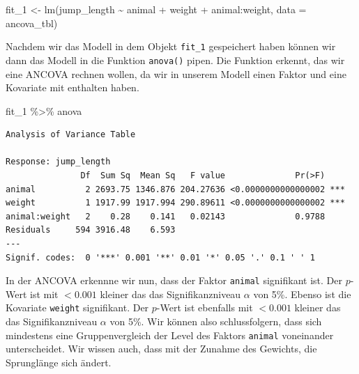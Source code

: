 \documentclass[
  letterpaper,
]{scrbook}
\newenvironment{Shaded}{\begin{snugshade}}{\end{snugshade}}
\newcommand{\AttributeTok}[1]{\textcolor[rgb]{0.40,0.45,0.13}{#1}}
\newcommand{\FunctionTok}[1]{\textcolor[rgb]{0.28,0.35,0.67}{#1}}
\newcommand{\NormalTok}[1]{\textcolor[rgb]{0.00,0.23,0.31}{#1}}
\newcommand{\OtherTok}[1]{\textcolor[rgb]{0.00,0.23,0.31}{#1}}
\newcommand{\SpecialCharTok}[1]{\textcolor[rgb]{0.37,0.37,0.37}{#1}}
\begin{document}
\begin{Shaded}
\begin{Highlighting}[]
\NormalTok{fit\_1 }\OtherTok{\textless{}{-}} \FunctionTok{lm}\NormalTok{(jump\_length }\SpecialCharTok{\textasciitilde{}}\NormalTok{ animal }\SpecialCharTok{+}\NormalTok{ weight }\SpecialCharTok{+}\NormalTok{ animal}\SpecialCharTok{:}\NormalTok{weight, }\AttributeTok{data =}\NormalTok{ ancova\_tbl)}
\end{Highlighting}
\end{Shaded}

Nachdem wir das Modell in dem Objekt \texttt{fit\_1} gespeichert haben
können wir dann das Modell in die Funktion \texttt{anova()} pipen. Die
Funktion erkennt, das wir eine ANCOVA rechnen wollen, da wir in unserem
Modell einen Faktor und eine Kovariate mit enthalten haben.

\begin{Shaded}
\begin{Highlighting}[]
\NormalTok{fit\_1 }\SpecialCharTok{\%\textgreater{}\%}\NormalTok{ anova }
\end{Highlighting}
\end{Shaded}

\begin{verbatim}
Analysis of Variance Table

Response: jump_length
               Df  Sum Sq  Mean Sq   F value              Pr(>F)    
animal          2 2693.75 1346.876 204.27636 <0.0000000000000002 ***
weight          1 1917.99 1917.994 290.89611 <0.0000000000000002 ***
animal:weight   2    0.28    0.141   0.02143              0.9788    
Residuals     594 3916.48    6.593                                  
---
Signif. codes:  0 '***' 0.001 '**' 0.01 '*' 0.05 '.' 0.1 ' ' 1
\end{verbatim}

In der ANCOVA erkennne wir nun, dass der Faktor \texttt{animal}
signifikant ist. Der \(p\)-Wert ist mit \(<0.001\) kleiner das das
Signifikanzniveau \(\alpha\) von 5\%. Ebenso ist die Kovariate
\texttt{weight} signifikant. Der \(p\)-Wert ist ebenfalls mit \(<0.001\)
kleiner das das Signifikanzniveau \(\alpha\) von 5\%. Wir können also
schlussfolgern, dass sich mindestens eine Gruppenvergleich der Level des
Faktors \texttt{animal} voneinander unterscheidet. Wir wissen auch, dass
mit der Zunahme des Gewichts, die Sprunglänge sich ändert.

{}
\end{document}
